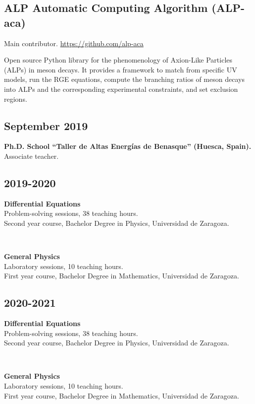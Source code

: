 \documentclass{cvf}
\begin{document}
\subsection{ALP Automatic Computing Algorithm (ALP-aca)}
Main contributor. \url{https://github.com/alp-aca}

Open source Python library for the phenomenology of Axion-Like Particles (ALPs) in meson decays. It provides a framework to match from specific UV models, run the RGE equations, compute the branching ratios of meson decays into ALPs and the corresponding experimental constraints, and set exclusion regions.


\subsection{September 2019}
\hspace{\parindent}\textbf{Ph.D. School ``Taller de Altas Energías de Benasque'' (Huesca, Spain).}\\
Associate teacher.

\subsection{2019-2020}
\hspace{\parindent}\textbf{Differential Equations}\\
Problem-solving sessions, 38 teaching hours.\\
Second year course, Bachelor Degree in Physics, Universidad de Zaragoza.

~

\textbf{General Physics}\\
Laboratory sessions, 10 teaching hours.\\
First year course, Bachelor Degree in Mathematics, Universidad de Zaragoza.

\subsection{2020-2021}
\hspace{\parindent}\textbf{Differential Equations}\\
Problem-solving sessions, 38 teaching hours.\\
Second year course, Bachelor Degree in Physics, Universidad de Zaragoza.

~

\textbf{General Physics}\\
Laboratory sessions, 10 teaching hours.\\
First year course, Bachelor Degree in Mathematics, Universidad de Zaragoza.
\end{document}
